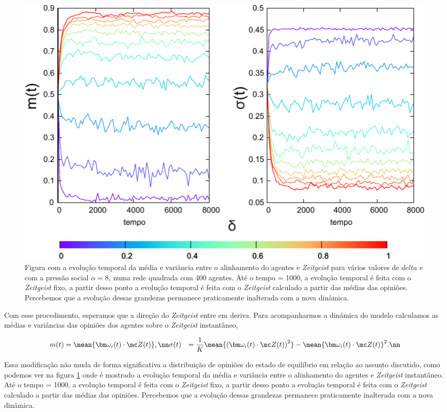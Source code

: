 \begin{figure}
    \centering
\includegraphics[width=1.2\textwidth]{Figures/evolveTermo}
\caption{
        Figura com a evolução temporal da média e variância entre o
    alinhamento do agentes e \textit{Zeitgeist} para vários valores de
    $delta$ e com a pressão social $\alpha = 8$, numa rede quadrada com
    400 agentes. Até o tempo = 1000, a evolução temporal é feita com
    o \textit{Zeitgeist} fixo, a partir desso ponto a evolução temporal
    é feita com o \textit{Zeitgeist} calculado a partir das médias das
    opiniões. Percebemos que a evolução dessas grandezas permanece
    praticamente inalterada com a nova dinâmica.
}
\label{fig:evolveTermo}
\end{figure}

Com esse procedimento, esperamos que a direção do \textit{Zeitgeist} entre em
deriva. Para acompanharmos a dinâmica do modelo calculamos as médias e
variâncias das opiniões dos agentes sobre o \textit{Zeitgeist} instantâneo,

\begin{align}
m(t) &= \mean{\bm \omega_i(t)\cdot \mc Z(t)}, \nn 
\sigma(t) &= \frac{1}{K}\mean{\left(\bm \omega_i(t)\cdot \mc Z(t)\right)^2}
    - \mean{\bm \omega_i(t)\cdot \mc Z(t)}^2. \nn 
\end{align}

Essa modificação não muda de forma significativa a distribuição
de opiniões do estado de equilíbrio em relação ao assunto discutido,
como podemos ver na figura \ref{fig:evolveTermo} onde é mostrado a
evolução temporal da média e variância entre o alinhamento do agentes e
\textit{Zeitgeist} instantâneo. Até o tempo = 1000, a evolução temporal
é feita com o \textit{Zeitgeist} fixo, a partir desso ponto a evolução
temporal é feita com o \textit{Zeitgeist} calculado a partir das médias das
opiniões. Percebemos que a evolução dessas grandezas permanece praticamente
inalterada com a nova dinâmica.

